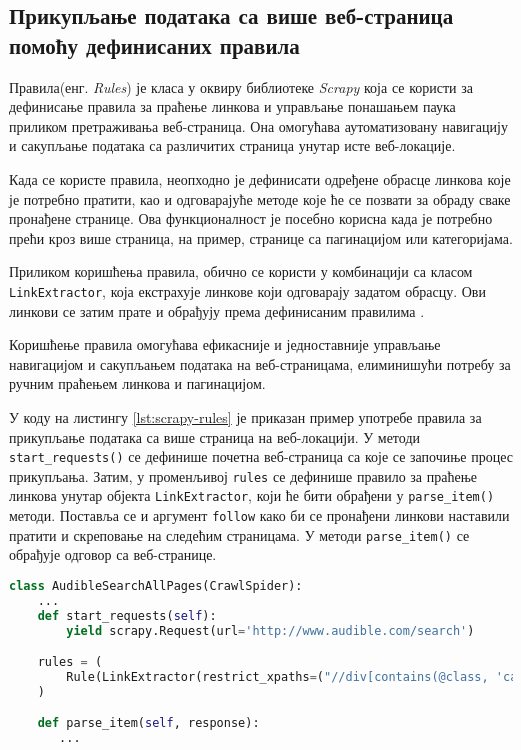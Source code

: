 \documentclass[12pt,oneside]{memoir}
\begin{document}
\subsection{Прикупљање података са више веб-страница помоћу дефинисаних правила}
Правила(енг. \textit{Rules}) је класа у оквиру библиотеке \textit{Scrapy} која се користи за дефинисање правила за праћење линкова и управљање понашањем паука приликом претраживања веб-страница. Она омогућава аутоматизовану навигацију и сакупљање података са различитих страница унутар исте веб-локације.

Када се користе правила, неопходно је дефинисати одређене обрасце линкова које је потребно пратити, као и одговарајуће методе које ће се позвати за обраду сваке пронађене странице. Ова функционалност је посебно корисна када је потребно прећи кроз више страница, на пример, странице са пагинацијом или категоријама.

Приликом коришћења правила, обично се користи у комбинацији са класом \texttt{LinkExtractor}, која екстрахује линкове који одговарају задатом обрасцу. Ови линкови се затим прате и обрађују према дефинисаним правилима \cite{scrapy}.

Коришћење правила омогућава ефикасније и једноставније управљање навигацијом и сакупљањем података на веб-страницама, елиминишући потребу за ручним праћењем линкова и пагинацијом.

У коду на листингу \ref{lst:scrapy-rules} је приказан пример употребе правила за прикупљање података са више страница на веб-локацији. У методи  \texttt{start\_requests()}  се дефинише почетна веб-страница са које се започиње процес прикупљања. Затим, у променљивој \texttt{rules} се дефинише правило за праћење линкова унутар објекта \texttt{LinkExtractor}, који ће бити обрађени у \texttt{parse\_item()} методи. Поставља се и аргумент \texttt{follow} како би се пронађени линкови наставили пратити и скреповање на следећим страницама. У методи \texttt{parse\_item()} се обрађује одговор са веб-странице.
\begin{lstlisting}[language=Python, caption={Прикупљање података са више страница коришћењем правила}, label={lst:scrapy-rules}]
class AudibleSearchAllPages(CrawlSpider):
    ...
    def start_requests(self):
        yield scrapy.Request(url='http://www.audible.com/search')

    rules = (
        Rule(LinkExtractor(restrict_xpaths=("//div[contains(@class, 'categories')]//a")), callback='parse_item', follow=True),
    )

    def parse_item(self, response):
       ...
\end{lstlisting}
\end{document}
